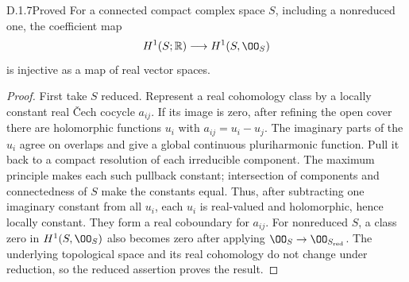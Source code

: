 
\begin{idstatement}{D.1.7}{Proved}\label{st:D.1.7}
For a connected compact complex space $S$, including a nonreduced
one, the coefficient map
\[
H^1(S;\mathbb R)\longrightarrow H^1(S,\OO_S)
\]
is injective as a map of real vector spaces.
\end{idstatement}
\begin{proof}
First take $S$ reduced. Represent a real cohomology class by a
locally constant real \v Cech cocycle $a_{ij}$. If its image is zero,
after refining the open cover there are holomorphic functions $u_i$
with $a_{ij}=u_i-u_j$. The imaginary parts of the $u_i$ agree on
overlaps and give a global continuous pluriharmonic function.
Pull it back to a compact resolution of each irreducible component.
The maximum principle makes each such pullback constant; intersection
of components and connectedness of $S$ make the constants equal.
Thus, after subtracting one imaginary constant from all $u_i$,
each $u_i$ is real-valued and holomorphic, hence locally constant.
They form a real coboundary for $a_{ij}$. For nonreduced $S$, a
class zero in $H^1(S,\OO_S)$ also becomes zero after applying
$\OO_S\to\OO_{S_{\rm red}}$. The underlying topological space
and its real cohomology do not change under reduction, so the
reduced assertion proves the result.
\end{proof}




